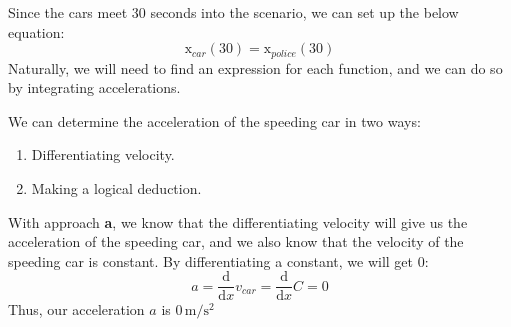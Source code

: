 \documentclass{article}
\newcommand{\x}{\mathrm{x}}
\newcommand{\ddx}{\frac{\mathrm{d}}{\mathrm{d}x}}
\begin{document}
	Since the cars meet 30 seconds into the scenario, we can set up the below equation:
	\[\x_{car}(30) = \x_{police}(30)\]
	Naturally, we will need to find an expression for each function, and we can do so by integrating accelerations.

	We can determine the acceleration of the speeding car in two ways:
	\begin{enumerate}[label=(\alph*)]
		\item Differentiating velocity.
		\item Making a logical deduction.
	\end{enumerate}

	With approach \textbf{a}, we know that the differentiating velocity will give us the acceleration of the speeding car,
	and we also know that the velocity of the speeding car is constant.
	By differentiating a constant, we will get $0$:
	\[a = \ddx v_{car} = \ddx C = 0\]
	Thus, our acceleration $a$ is $0\,\mathrm{m/s^2}$
\end{document}
